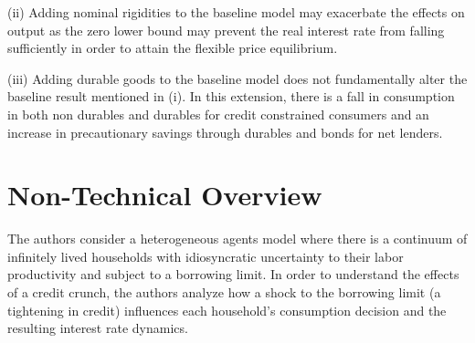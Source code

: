 \documentclass[./GL2017.tex]{subfiles}
\begin{document}
(ii) Adding nominal rigidities to the baseline model may  exacerbate the effects on output as the zero lower bound may prevent the real interest rate from falling sufficiently in order to attain the flexible price equilibrium.

(iii) Adding durable goods to the baseline model does not fundamentally alter the baseline result mentioned in (i). In this extension, there is a fall in consumption in both non durables and durables for credit constrained consumers and an increase in precautionary savings through durables and bonds for net lenders.  

\hypertarget{Non-Technical Overview}{}
\section{Non-Technical Overview}

The authors consider a heterogeneous agents model where there is a continuum of infinitely lived households with idiosyncratic uncertainty to their labor productivity and subject to a borrowing limit.  In order to understand the effects of a credit crunch, the authors analyze how a shock to the borrowing limit (a tightening in credit) influences each household's consumption decision and the resulting interest rate dynamics. 
\end{document}
